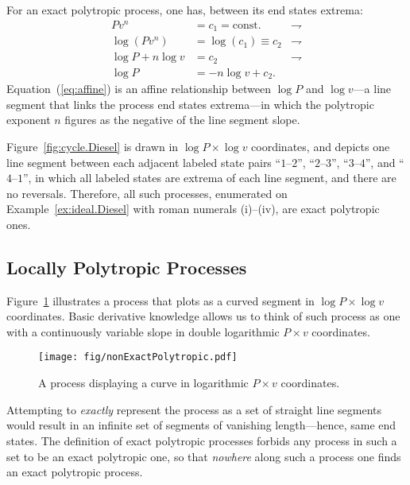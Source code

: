 \documentclass[fleqn,11pt]{SelfArx}
\begin{document}
    For an exact polytropic process, one has, between its end states extrema:%
    \begin{align}
        Pv^n & = c_1 = \text{const.}        & \rightharpoondown\\
        \log(Pv^n) & = \log(c_1) \equiv c_2 & \rightharpoondown\\
        \log P + n\log v & = c_2            & \rightharpoondown\\
        \log P & = -n\log v + c_2. \label{eq:affine}
    \end{align}
    Equation~(\ref{eq:affine}) is an affine relationship between $\log P$ and $\log v$---a  line
    segment that links the process end states extrema---in which  the  polytropic  exponent  $n$
    figures as the negative of the line segment slope.

    Figure~\ref{fig:cycle.Diesel} is drawn in $\log P \times \log v$  coordinates,  and  depicts
    one line segment between each  adjacent  labeled  state  pairs  ``$1$--$2$'',  ``$2$--$3$'',
    ``$3$--$4$'', and ``$4$--$1$'', in which  all  labeled  states  are  extrema  of  each  line
    segment,  and  there  are  no  reversals.  Therefore,  all  such  processes,  enumerated  on
    Example~\ref{ex:ideal.Diesel} with roman numerals (i)--(iv), are exact polytropic ones.

    \subsection{Locally Polytropic Processes}

    Figure~\ref{fig:non.exact} illustrates a process that plots as a curved segment in  $\log  P
    \times \log v$ coordinates. Basic derivative knowledge allows us to think of such process as
    one with a continuously variable slope in double logarithmic $P\times v$ coordinates.

    \begin{figure}[ht]
        \centering
        \texttt{[image: fig/nonExactPolytropic.pdf]}
        \caption{A process displaying a curve in logarithmic $P\times v$ coordinates.}
        \label{fig:non.exact}
    \end{figure}

    Attempting to \emph{exactly} represent the process as a set of straight line segments  would
    result in an infinite set of segments of vanishing  length---hence,  same  end  states.  The
    definition of exact polytropic processes forbids any process in such a set to  be  an  exact
    polytropic one, so that \emph{nowhere} along such a process one finds  an  exact  polytropic
    process.
\end{document}
